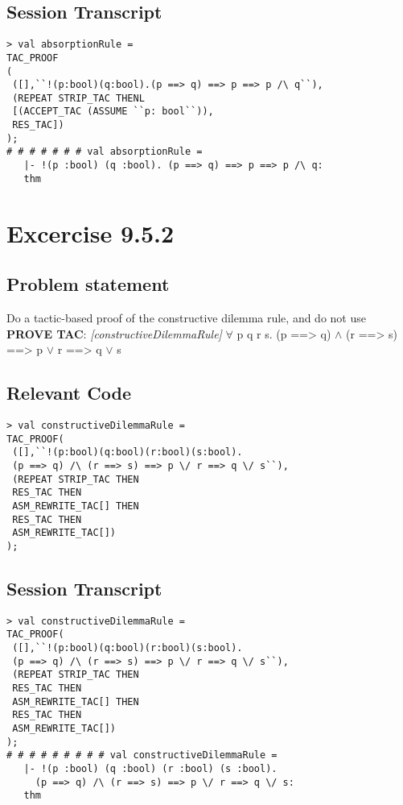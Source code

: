\documentclass{report}
\begin{document}
\section{Session Transcript}
\label{trans-9-5-1}

\begin{session}
  \begin{scriptsize}
\begin{verbatim}
> val absorptionRule =
TAC_PROOF
(
 ([],``!(p:bool)(q:bool).(p ==> q) ==> p ==> p /\ q``),
 (REPEAT STRIP_TAC THENL
 [(ACCEPT_TAC (ASSUME ``p: bool``)),
 RES_TAC])
);
# # # # # # # val absorptionRule =
   |- !(p :bool) (q :bool). (p ==> q) ==> p ==> p /\ q:
   thm

\end{verbatim}
  \end{scriptsize}
\end{session}


\chapter{Excercise 9.5.2}
\label{cha:9.5.2}

\section{Problem statement}
\label{problem-statement-9-5-2}
Do a tactic-based proof of the constructive dilemma rule, and do not use \textbf{PROVE TAC}:
\emph{[constructiveDilemmaRule]}
 $\forall$ p q r s. (p ==> q) $\land$ (r ==> s) ==> p $\lor$ r ==> q $\lor$ s
 
\section{Relevant Code}
\label{rel-code-9-5-2}
\begin{lstlisting}[frame=TBlr]
> val constructiveDilemmaRule =
TAC_PROOF(
 ([],``!(p:bool)(q:bool)(r:bool)(s:bool).
 (p ==> q) /\ (r ==> s) ==> p \/ r ==> q \/ s``),
 (REPEAT STRIP_TAC THEN
 RES_TAC THEN
 ASM_REWRITE_TAC[] THEN
 RES_TAC THEN
 ASM_REWRITE_TAC[])
);
\end{lstlisting}

\section{Session Transcript}
\label{trans-9-5-2}

\begin{session}
  \begin{scriptsize}
\begin{verbatim}
> val constructiveDilemmaRule =
TAC_PROOF(
 ([],``!(p:bool)(q:bool)(r:bool)(s:bool).
 (p ==> q) /\ (r ==> s) ==> p \/ r ==> q \/ s``),
 (REPEAT STRIP_TAC THEN
 RES_TAC THEN
 ASM_REWRITE_TAC[] THEN
 RES_TAC THEN
 ASM_REWRITE_TAC[])
);
# # # # # # # # # val constructiveDilemmaRule =
   |- !(p :bool) (q :bool) (r :bool) (s :bool).
     (p ==> q) /\ (r ==> s) ==> p \/ r ==> q \/ s:
   thm
\end{verbatim}
  \end{scriptsize}
\end{session}
\end{document}
